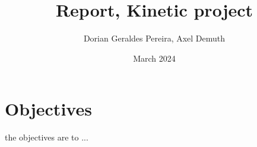 \documentclass{article}
\title{Report, Kinetic project}
\author{Dorian Geraldes Pereira, Axel Demuth}
\date{March 2024}
\begin{document}
\maketitle

\tableofcontents
\newpage


\section{Objectives}

the objectives are to ...
 
\end{document}
